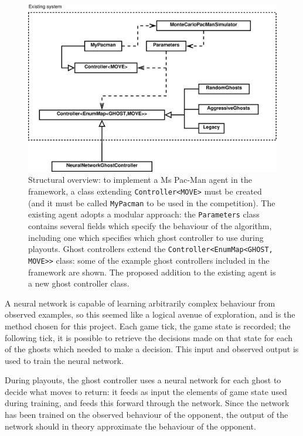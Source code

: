 \begin{figure}
\includegraphics[width=\linewidth]{diagrams/proposed}
\caption[Structural overview]{Structural overview: to implement a Ms Pac-Man agent in the framework, a class extending {\tt Controller<MOVE>} must be created (and it must be called {\tt MyPacman} to be used in the competition).  The existing agent adopts a modular approach: the {\tt Parameters} class contains several fields which specify the behaviour of the algorithm, including one which specifies which ghost controller to use during playouts.  Ghost controllers extend the {\tt Controller<EnumMap<GHOST, MOVE>>} class: some of the example ghost controllers included in the framework are shown.  The proposed addition to the existing agent is a new ghost controller class.}
\label{fig:proposed}
\end{figure}

A neural network is capable of learning arbitrarily complex behaviour from observed examples, so this seemed like a logical avenue of exploration, and is the method chosen for this project.  Each game tick, the game state is recorded; the following tick, it is possible to retrieve the decisions made on that state for each of the ghosts which needed to make a decision.  This input and observed output is used to train the neural network.

During playouts, the ghost controller uses a neural network for each ghost to decide what moves to return: it feeds as input the elements of game state used during training, and feeds this forward through the network.  Since the network has been trained on the observed behaviour of the opponent, the output of the network should in theory approximate the behaviour of the opponent.

